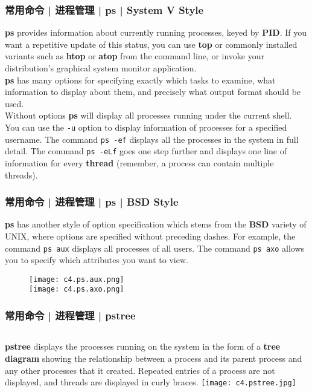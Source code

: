 \begin{frame}[fragile]
  \frametitle{常用命令 | 进程管理 | ps | System V Style}
  \textbf{ps} provides information about currently running processes, keyed by \textbf{PID}. If you want a repetitive update of this status, you can use \textbf{top} or commonly installed variants such as \textbf{htop} or \textbf{atop} from the command line, or invoke your distribution's graphical system monitor application.\\
  \vspace{0.2cm}
  \textbf{ps} has many options for specifying exactly which tasks to examine, what information to display about them, and precisely what output format should be used.\\
  \vspace{0.2cm}
  Without options \textbf{ps} will display all processes running under the current shell. You can use the \verb|-u| option to display information of processes for a specified username. The command \verb|ps -ef| displays all the processes in the system in full detail. The command \verb|ps -eLf| goes one step further and displays one line of information for every \textbf{thread} (remember, a process can contain multiple threads).
\end{frame}

\begin{frame}[fragile]
  \frametitle{常用命令 | 进程管理 | ps | BSD Style}
  \textbf{ps} has another style of option specification which stems from the \textbf{BSD} variety of UNIX, where options are specified without preceding dashes.  For example, the command \verb|ps aux| displays all processes of all users. The command \verb|ps axo| allows you to specify which attributes you want to view.
  \begin{figure}
    \centering
    \texttt{[image: c4.ps.aux.png]}\\
    \texttt{[image: c4.ps.axo.png]}
  \end{figure}
\end{frame}

\begin{frame}
  \frametitle{常用命令 | 进程管理 | pstree}
  \begin{columns}
  \textbf{pstree} displays the processes running on the system in the form of a \textbf{tree diagram} showing the relationship between a process and its parent process and any other processes that it created. Repeated entries of a process are not displayed, and threads are displayed in curly braces.
    \texttt{[image: c4.pstree.jpg]}
  \end{columns}
\end{frame}

